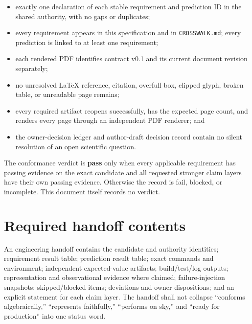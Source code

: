 \documentclass[10pt]{article}
\begin{document}
\begin{itemize}
\item exactly one declaration of each stable requirement and prediction ID in
the shared authority, with no gaps or duplicates;
\item every requirement appears in this specification and in
\texttt{CROSSWALK.md}; every prediction is linked to at least one requirement;
\item each rendered PDF identifies contract v0.1 and its current document
revision separately;
\item no unresolved LaTeX reference, citation, overfull box, clipped glyph,
broken table, or unreadable page remains;
\item every required artifact reopens successfully, has the expected page
count, and renders every page through an independent PDF renderer; and
\item the owner-decision ledger and author-draft decision record contain no
silent resolution of an open scientific question.
\end{itemize}

The conformance verdict is \textbf{pass} only when every applicable requirement
has passing evidence on the exact candidate and all requested stronger claim
layers have their own passing evidence. Otherwise the record is fail, blocked,
or incomplete. This document itself records no verdict.

\section{Required handoff contents}

An engineering handoff contains the candidate and authority identities;
requirement result table; prediction result table; exact commands and
environment; independent expected-value artifacts; build/test/log outputs;
representation and observational evidence where claimed; failure-injection
snapshots; skipped/blocked items; deviations and owner dispositions; and an
explicit statement for each claim layer. The handoff shall not collapse
``conforms algebraically,'' ``represents faithfully,'' ``performs on sky,'' and
``ready for production'' into one status word.
\end{document}

